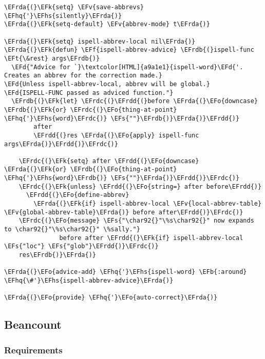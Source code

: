 \documentclass[a4wide,10pt]{article}
\newcommand{\EFs}[1]{\textcolor{EFs}{#1}} %
\newcommand{\EFd}[1]{\textcolor{EFd}{#1}} %
\newcommand{\EFk}[1]{\textcolor{EFk}{#1}} %
\newcommand{\EFb}[1]{\textcolor{EFb}{#1}} %
\newcommand{\EFf}[1]{\textcolor{EFf}{#1}} %
\newcommand{\EFv}[1]{\textcolor{EFv}{#1}} %
\newcommand{\EFt}[1]{\textcolor{EFt}{#1}} %
\newcommand{\EFo}[1]{\textcolor{EFo}{#1}} %
\newcommand{\EFhq}[1]{\textcolor{EFhq}{#1}} %
\newcommand{\EFhs}[1]{\textcolor{EFhs}{#1}} %
\newcommand{\EFrda}[1]{\textcolor{EFrda}{#1}} %
\newcommand{\EFrdb}[1]{\textcolor{EFrdb}{#1}} %
\newcommand{\EFrdc}[1]{\textcolor{EFrdc}{#1}} %
\newcommand{\EFrdd}[1]{\textcolor{EFrdd}{#1}} %
\begin{document}
\begin{Code}
\begin{Verbatim}
\EFrda{(}\EFk{setq} \EFv{save-abbrevs} \EFhq{'}\EFhs{silently}\EFrda{)}
\EFrda{(}\EFk{setq-default} \EFv{abbrev-mode} t\EFrda{)}

\EFrda{(}\EFk{setq} ispell-abbrev-local nil\EFrda{)}
\EFrda{(}\EFk{defun} \EFf{ispell-abbrev-advice} \EFrdb{(}ispell-func \EFt{\&rest} args\EFrdb{)}
  \EFd{"Advice for `}\textcolor[HTML]{a9a1e1}{ispell-word}\EFd{'. Creates an abbrev for the correction made.}
\EFd{Unless ispell-abbrev-local, abbrev will be global.}
\EFd{ISPELL-FUNC passed as adviced function."}
  \EFrdb{(}\EFk{let} \EFrdc{(}\EFrdd{(}before \EFrda{(}\EFo{downcase} \EFrdb{(}\EFk{or} \EFrdc{(}\EFo{thing-at-point} \EFhq{'}\EFhs{word}\EFrdc{)} \EFs{""}\EFrdb{)}\EFrda{)}\EFrdd{)}
        after
        \EFrdd{(}res \EFrda{(}\EFo{apply} ispell-func args\EFrda{)}\EFrdd{)}\EFrdc{)}

    \EFrdc{(}\EFk{setq} after \EFrdd{(}\EFo{downcase} \EFrda{(}\EFk{or} \EFrdb{(}\EFo{thing-at-point} \EFhq{'}\EFhs{word}\EFrdb{)} \EFs{""}\EFrda{)}\EFrdd{)}\EFrdc{)}
    \EFrdc{(}\EFk{unless} \EFrdd{(}\EFo{string=} after before\EFrdd{)}
      \EFrdd{(}\EFo{define-abbrev}
        \EFrda{(}\EFk{if} ispell-abbrev-local \EFv{local-abbrev-table} \EFv{global-abbrev-table}\EFrda{)} before after\EFrdd{)}\EFrdc{)}
    \EFrdc{(}\EFo{message} \EFs{"\char92{}"\%s\char92{}" now expands to \char92{}"\%s\char92{}" \%sally."}
               before after \EFrdd{(}\EFk{if} ispell-abbrev-local \EFs{"loc"} \EFs{"glob"}\EFrdd{)}\EFrdc{)}
    res\EFrdb{)}\EFrda{)}

\EFrda{(}\EFo{advice-add} \EFhq{'}\EFhs{ispell-word} \EFb{:around} \EFhq{\#'}\EFhs{ispell-abbrev-advice}\EFrda{)}

\EFrda{(}\EFo{provide} \EFhq{'}\EFo{auto-correct}\EFrda{)}
\end{Verbatim}
\end{Code}
\subsection{Beancount}
\label{sec:org9e0dd7a}
\subsubsection{Requirements}
\label{sec:orgfb83020}
\end{document}
